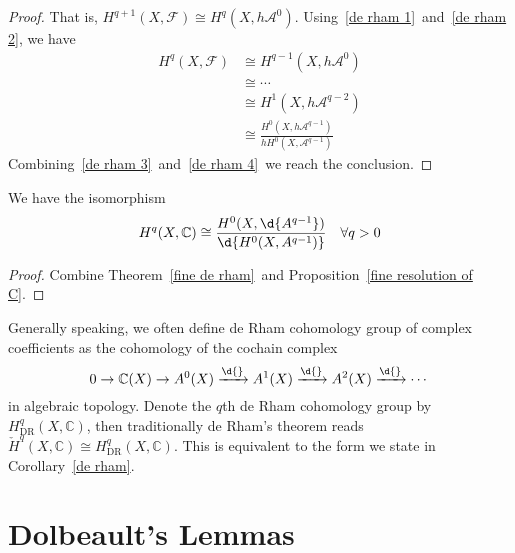 \begin{proof}
    That is, $H^{q+1}(X,\mathcal{F})\cong H^q(X,h\mathcal{A}^0)$.
    Using~\eqref{de rham 1}~and~\eqref{de rham 2}, we have
    \begin{equation}
        \begin{aligned}
            H^q(X,\mathcal{F})&\cong H^{q-1}(X,h\mathcal{A}^0)\\
            &\cong\cdots\\
            &\cong H^1(X,h\mathcal{A}^{q-2})\\
            &\cong\frac{H^0(X,h\mathcal{A}^{q-1})}{hH^0(X,\mathcal{A}^{q-1})}
        \end{aligned}\label{de rham 4}
    \end{equation}
    Combining~\eqref{de rham 3}~and~\eqref{de rham 4}~we reach the conclusion.
\end{proof}

\begin{cor}\label{de rham}
    We have the isomorphism
    \[H^q(X,\mathbb{C})\cong\frac{H^0(X,\d{A^{q-1}})}{\d{H^0(X,A^{q-1})}}\quad\forall q>0\]
\end{cor}
\begin{proof}
    Combine Theorem~\ref{fine de rham}~and Proposition~\ref{fine resolution of C}.
\end{proof}

\begin{rem}
    Generally speaking, we often define de Rham cohomology group of complex coefficients as the cohomology of the cochain complex
    \[0\to\mathbb{C}(X)\to A^0(X)\xrightarrow{\d{}}A^1(X)\xrightarrow{\d{}}A^2(X)\xrightarrow{\d{}}\cdots\]
    in algebraic topology.
    Denote the $q$th de Rham cohomology group by $H^q_{\mathrm{DR}}(X,\mathbb{C})$, then traditionally de Rham's theorem reads $\check{H}^q(X,\mathbb{C})\cong H^q_{\mathrm{DR}}(X,\mathbb{C})$.
    This is equivalent to the form we state in Corollary~\ref{de rham}.
\end{rem}

\section{Dolbeault's Lemmas}
